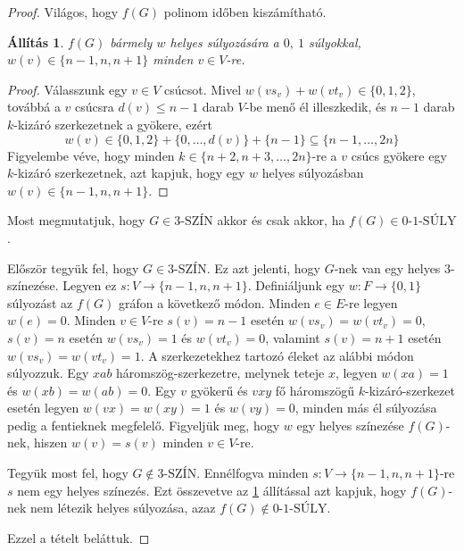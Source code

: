\documentclass[12pt, a4paper]{report}
\newtheorem{áll}[tét]{Állítás}
\theoremstyle{remark}
\theoremstyle{definition}
\begin{document}
\begin{proof}
Világos, hogy $f(G)$ polinom időben kiszámítható.

\begin{áll} \label{pro:npreduct01}
$f(G)$ bármely $w$ helyes súlyozására a $0,\ 1$ súlyokkal, $w(v) \in \lbrace n - 1, n, n + 1 \rbrace$ minden $v \in V$-re.
\end{áll}

\begin{proof}
Válasszunk egy $v \in V$ csúcsot. Mivel $w(vs_v) + w(vt_v) \in \lbrace 0, 1, 2 \rbrace$, továbbá a $v$ csúcsra $d(v) \leq n - 1$ darab $V$-be menő él illeszkedik, és $n - 1$ darab $k$-kizáró szerkezetnek a gyökere, ezért
\begin{equation*}
w(v) \in \lbrace 0, 1, 2 \rbrace + \lbrace 0, \ldots, d(v) \rbrace + \lbrace n - 1 \rbrace \subseteq \lbrace n - 1, \ldots, 2n \rbrace
\end{equation*}
Figyelembe véve, hogy minden $k \in \lbrace n + 2, n + 3, \ldots, 2n \rbrace$-re a $v$ csúcs gyökere egy $k$-kizáró szerkezetnek, azt kapjuk, hogy egy $w$ helyes súlyozásban $w(v) \in \lbrace n - 1, n, n + 1 \rbrace$.
\end{proof}

Most megmutatjuk, hogy $G \in \textrm{3-SZÍN}$ akkor és csak akkor, ha $f(G) \in \textrm{0-1-SÚLY}$.

Először tegyük fel, hogy $G \in \textrm{3-SZÍN}$. Ez azt jelenti, hogy $G$-nek van egy helyes $3$-színezése. Legyen ez $s: V \rightarrow \lbrace n - 1, n, n + 1 \rbrace$. Definiáljunk egy $w: F \rightarrow \lbrace 0, 1 \rbrace$ súlyozást az $f(G)$ gráfon a következő módon. Minden $e \in E$-re legyen $w(e) = 0$. Minden $v \in V$-re $s(v) = n - 1$ esetén $w(vs_v) = w(vt_v) = 0$, $s(v) = n$ esetén $w(vs_v) = 1$ és $w(vt_v) = 0$, valamint $s(v) = n + 1$ esetén $w(vs_v) = w(vt_v) = 1$. A szerkezetekhez tartozó éleket az alábbi módon súlyozzuk. Egy $xab$ háromszög-szerkezetre, melynek teteje $x$, legyen $w(xa) = 1$ és $w(xb) = w(ab) = 0$. Egy $v$ gyökerű és $vxy$ fő háromszögű $k$-kizáró-szerkezet esetén legyen $w(vx) = w(xy) = 1$ és $w(vy) = 0$, minden más él súlyozása pedig a fentieknek megfelelő. Figyeljük meg, hogy $w$ egy helyes színezése $f(G)$-nek, hiszen $w(v) = s(v)$ minden $v \in V$-re.

Tegyük most fel, hogy $G \notin \textrm{3-SZÍN}$. Ennélfogva minden $s: V \rightarrow \lbrace n - 1, n, n + 1 \rbrace$-re $s$ nem egy helyes színezés. Ezt összevetve az \ref{pro:npreduct01} állítással azt kapjuk, hogy $f(G)$-nek nem létezik helyes súlyozása, azaz $f(G) \notin \textrm{0-1-SÚLY}$.

Ezzel a tételt beláttuk.
\end{proof}

\printbibliography
\end{document}
